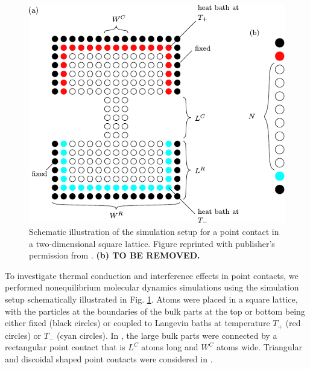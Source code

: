 
\begin{figure}
\begin{center}
 \includegraphics[width=.85\columnwidth]{pics/fpu_fig1.pdf}
 \caption{Schematic illustration of the simulation setup for a point contact in a two-dimensional square lattice. Figure reprinted with publisher's permission from . \textbf{(b) TO BE REMOVED.}}
\label{fig:fpu_fig1}
\end{center}
\end{figure}

To investigate thermal conduction and interference effects in point contacts, we performed nonequilibrium molecular dynamics simulations using the simulation setup schematically illustrated in Fig. \ref{fig:fpu_fig1}. Atoms were placed in a square lattice, with the particles at the boundaries of the bulk parts at the top or bottom being either fixed (black circles) or coupled to Langevin baths at temperature $T_+$ (red circles) or $T_-$ (cyan circles). In , the large bulk parts were connected by a rectangular point contact that is $L^C$ atoms long and $W^C$ atoms wide. Triangular and discoidal shaped point contacts were considered in . 

